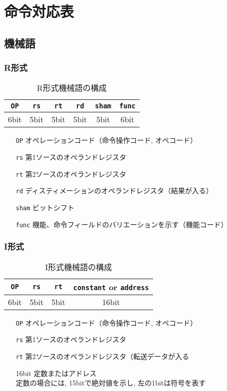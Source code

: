 \documentclass[a4paper, xelatex, ja=standard]{bxjsarticle}
\begin{document}
\section{命令対応表}
\subsection{機械語}
\subsubsection*{R形式}
\begin{table}[h]
  \centering
  \caption{R形式機械語の構成}
  \label{}
  \begin{tabular}{|c|c|c|c|c|c|}\hline
  \texttt{OP} & \texttt{rs} & \texttt{rt} & \texttt{rd} & \texttt{sham} & \texttt{func} \\\hline
  6bit & 5bit & 5bit & 5bit & 5bit & 6bit \\\hline
  \end{tabular}
\end{table}
\begin{enumerate}
  \item[\texttt{OP}]オペレーションコード（命令操作コード, オペコード）
  \item[\texttt{rs}]第1ソースのオペランドレジスタ
  \item[\texttt{rt}]第2ソースのオペランドレジスタ
  \item[\texttt{rd}]ディスティメーションのオペランドレジスタ（結果が入る）
  \item[\texttt{sham}]ビットシフト
  \item[\texttt{func}]機能、命令フィールドのバリエーションを示す（機能コード）
\end{enumerate}

\subsubsection*{I形式}
\begin{table}[h]
  \centering
  \caption{I形式機械語の構成}
  \label{}
  \begin{tabular}{|c|c|c|c|}\hline
  \texttt{OP} & \texttt{rs} & \texttt{rt} & \texttt{constant} or \texttt{address} \\\hline
  6bit & 5bit & 5bit & 16bit \\\hline
  \end{tabular}
\end{table}
\begin{enumerate}
  \item[\texttt{OP}]オペレーションコード（命令操作コード, オペコード）
  \item[\texttt{rs}]第1ソースのオペランドレジスタ
  \item[\texttt{rt}]第2ソースのオペランドレジスタ（転送データが入る
  \item[16bit]定数またはアドレス\\定数の場合には, 15bitで絶対値を示し, 左の1bitは符号を表す
\end{enumerate}
\end{document}

